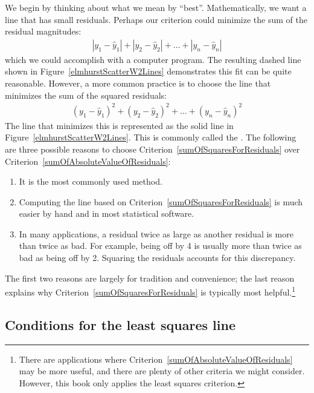 We begin by thinking about what we mean by ``best''. Mathematically, we want a line that has small residuals. Perhaps our criterion could minimize the sum of the residual magnitudes:
\begin{eqnarray}
|y_1 - \hat{y}_1| + |y_2-\hat{y}_2| + \dots + |y_n-\hat{y}_n|
\label{sumOfAbsoluteValueOfResiduals}
\end{eqnarray}
which we could accomplish with a computer program. The resulting dashed line shown in Figure~\ref{elmhurstScatterW2Lines} demonstrates this fit can be quite reasonable. However, a more common practice is to choose the line that minimizes the sum of the squared residuals:
\begin{eqnarray}
(y_1 - \hat{y}_1)^2 + (y_2-\hat{y}_2)^2+ \dots + (y_n-\hat{y}_n)^2
\label{sumOfSquaresForResiduals}
\end{eqnarray}
The line that minimizes this  is represented as the solid line in Figure~\ref{elmhurstScatterW2Lines}. This is commonly called the . The following are three possible reasons to choose Criterion~\eqref{sumOfSquaresForResiduals} over Criterion~\eqref{sumOfAbsoluteValueOfResiduals}:
\begin{enumerate}
\item It is the most commonly used method.
\item Computing the line based on Criterion~\eqref{sumOfSquaresForResiduals} is much easier by hand and in most statistical software.
\item In many applications, a residual twice as large as another residual is more than twice as bad. For example, being off by 4 is usually more than twice as bad as being off by 2. Squaring the residuals accounts for this discrepancy.
\end{enumerate}
The first two reasons are largely for tradition and convenience; the last reason explains why Criterion~\eqref{sumOfSquaresForResiduals} is typically most helpful.\footnote{There are applications where Criterion~\eqref{sumOfAbsoluteValueOfResiduals} may be more useful, and there are plenty of other criteria we might consider. However, this book only applies the least squares criterion.}

\subsection{Conditions for the least squares line}


